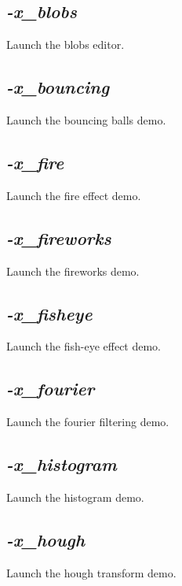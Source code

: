 \documentclass[a4paper,11pt,twoside]{book}
\begin{document}
\subsection{\emph{-x\_blobs} }\vspace*{-0.5em}
Launch the blobs editor.


\subsection{\emph{-x\_bouncing} }\vspace*{-0.5em}
Launch the bouncing balls demo.


\subsection{\emph{-x\_fire} }\vspace*{-0.5em}
Launch the fire effect demo.


\subsection{\emph{-x\_fireworks} }\vspace*{-0.5em}
Launch the fireworks demo.


\subsection{\emph{-x\_fisheye} }\vspace*{-0.5em}
Launch the fish-eye effect demo.


\subsection{\emph{-x\_fourier} }\vspace*{-0.5em}
Launch the fourier filtering demo.


\subsection{\emph{-x\_histogram} }\vspace*{-0.5em}
Launch the histogram demo.


\subsection{\emph{-x\_hough} }\vspace*{-0.5em}
Launch the hough transform demo.
\end{document}
